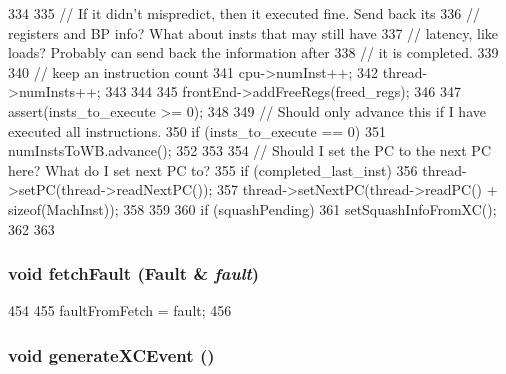 \begin{DoxyCode}
{{{334         }
335         // If it didn't mispredict, then it executed fine.  Send back its
336         // registers and BP info?  What about insts that may still have
337         // latency, like loads?  Probably can send back the information after
338         // it is completed.
339 
340         // keep an instruction count
341         cpu->numInst++;
342         thread->numInsts++;
343     }
344 
345     frontEnd->addFreeRegs(freed_regs);
346 
347     assert(insts_to_execute >= 0);
348 
349     // Should only advance this if I have executed all instructions.
350     if (insts_to_execute == 0) {
351         numInstsToWB.advance();
352     }
353 
354     // Should I set the PC to the next PC here?  What do I set next PC to?
355     if (completed_last_inst) {
356         thread->setPC(thread->readNextPC());
357         thread->setNextPC(thread->readPC() + sizeof(MachInst));
358     }
359 
360     if (squashPending) {
361         setSquashInfoFromXC();
362     }
363 }
\end{DoxyCode}
\hypertarget{classInorderBackEnd_a71dcc69e5b01fa12b8ccd2dccdcc9917}{
\subsubsection[{fetchFault}]{\setlength{\rightskip}{0pt plus 5cm}void fetchFault ({\bf Fault} \& {\em fault})}}
\label{classInorderBackEnd_a71dcc69e5b01fa12b8ccd2dccdcc9917}



\begin{DoxyCode}
454 {
455     faultFromFetch = fault;
456 }
\end{DoxyCode}
\hypertarget{classInorderBackEnd_ae4e704602e6cab77b5b96396fee5d104}{
\subsubsection[{generateXCEvent}]{\setlength{\rightskip}{0pt plus 5cm}void generateXCEvent ()}}
\label{classInorderBackEnd_ae4e704602e6cab77b5b96396fee5d104}



